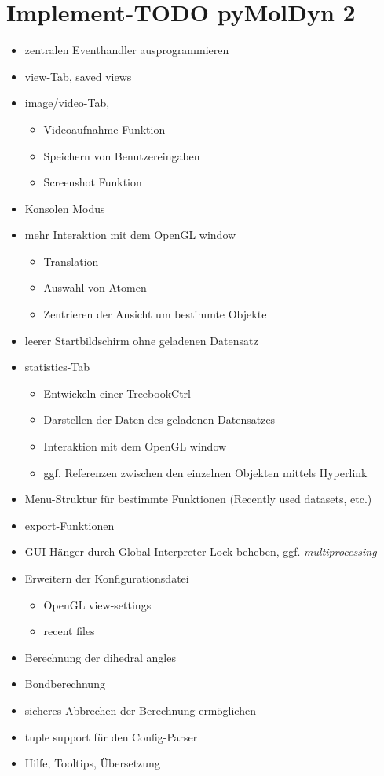 \documentclass[a4paper,12pt]{scrartcl}
\begin{document}
\thispagestyle{empty}
\section*{Implement-TODO pyMolDyn 2}

\begin{itemize}
\item zentralen Eventhandler ausprogrammieren
\item view-Tab, saved views
\item image/video-Tab,
\begin{itemize}
	\item Videoaufnahme-Funktion
	\item Speichern von Benutzereingaben
	\item Screenshot Funktion
\end{itemize}
\item Konsolen Modus
\item mehr Interaktion mit dem OpenGL window
\begin{itemize}
	\item Translation
	\item Auswahl von Atomen
	\item Zentrieren der Ansicht um bestimmte Objekte
\end{itemize}
\item leerer Startbildschirm ohne geladenen Datensatz
\item statistics-Tab
\begin{itemize}
	\item Entwickeln einer TreebookCtrl
	\item Darstellen der Daten des geladenen Datensatzes
	\item Interaktion mit dem OpenGL window
	\item ggf. Referenzen zwischen den einzelnen Objekten mittels Hyperlink
\end{itemize}
\item Menu-Struktur für bestimmte Funktionen (Recently used datasets, etc.)
\item export-Funktionen
\item GUI Hänger durch Global Interpreter Lock beheben, ggf. \textit{multiprocessing}
\item Erweitern der Konfigurationsdatei
\begin{itemize}
	\item OpenGL view-settings
	\item recent files
\end{itemize}
\item Berechnung der dihedral angles
\item Bondberechnung
\item sicheres Abbrechen der Berechnung ermöglichen
\item tuple support für den Config-Parser
\item Hilfe, Tooltips, Übersetzung
\end{itemize}
\clearpage
\end{document}
